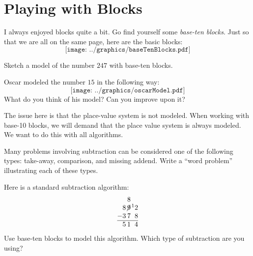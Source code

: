 \newpage
\section{Playing with Blocks}\label{A:B1}

I always enjoyed blocks quite a bit. Go find yourself
some \textit{base-ten blocks}. Just so that we are all on the same
page, here are the basic blocks:
\[
\texttt{[image: ../graphics/baseTenBlocks.pdf]}
\]

\begin{prob} 
Sketch a model of the number $247$ with base-ten blocks.
\vspace{0.8in}
\end{prob}

\begin{prob}
Oscar modeled the number $15$ in the following way:
\[
\texttt{[image: ../graphics/oscarModel.pdf]}
\]
What do you think of his model?  Can you improve upon it?  
\vspace{0.5in}
\end{prob}

\begin{teachingnote}
The issue here is that the place-value system is not modeled. When
working with base-10 blocks, we will demand that the place value
system is always modeled.  We want to do this with all algorithms.  
\end{teachingnote}

\begin{prob}
Many problems involving subtraction can be considered one of the following types:  take-away, comparison, and missing addend.  Write a ``word problem'' illustrating each of these types.  
\end{prob}

\newpage

\begin{prob} 
Here is a standard subtraction algorithm:
\[
\begin{tabular}{@{}r@{}r@{}r@{}r@{}}
&   & 8 &  \\
& 8 & $\not{\hspace{-.2ex}9}$ & $\hspace{.3ex}\leftexp{1}2$\\
$-$ & 3 & 7 & 8\\ \hline
& 5 & 1 & 4
\end{tabular}
\]
Use base-ten blocks to model this algorithm.  Which type of subtraction are you using?  
\end{prob}

